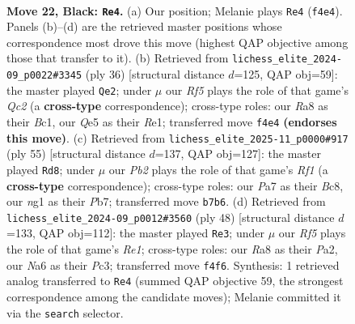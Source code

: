 \documentclass[11pt]{article}
\begin{document}
\clearpage

\begin{figure}[p]\centering
\begin{subfigure}{0.46\textwidth}\centering
\resizebox{\linewidth}{!}{%
\newchessgame
\chessboard[
  setfen={r1b2k2/pp3pp1/n3p3/3pq3/3n1r2/PPQ1N3/6PP/R2K2NR b - - 1 22},
  showmover=false,
  pgfstyle=straightmove, color=movearrow, markmove={f4-e4}
]}
\caption{}
\end{subfigure}\hfill
\begin{subfigure}{0.46\textwidth}\centering
\resizebox{\linewidth}{!}{%
\newchessgame
\chessboard[
  setfen={r6r/1pp1b1k1/p1n2n1p/5q2/3PN3/2P5/PPQ3PP/R1B1R1K1 w - - 1 19},
  showmover=false,
  pgfstyle=straightmove, color=movearrow, markmove={c2-e2}
]}
\caption{}
\end{subfigure}
\\[4pt]
\begin{subfigure}{0.46\textwidth}\centering
\resizebox{\linewidth}{!}{%
\newchessgame
\chessboard[
  setfen={2b2rk1/1pp2pb1/4p1p1/1Pnq4/3N3P/2Q5/2B2PP1/3R1K1R b - - 1 28},
  showmover=false,
  pgfstyle=straightmove, color=movearrow, markmove={f8-d8}
]}
\caption{}
\end{subfigure}\hfill
\begin{subfigure}{0.46\textwidth}\centering
\resizebox{\linewidth}{!}{%
\newchessgame
\chessboard[
  setfen={1r3r1k/6pp/b1pp1p2/4q3/P2RN3/2P4P/P1Q2PP1/4R1K1 w - - 2 25},
  showmover=false,
  pgfstyle=straightmove, color=movearrow, markmove={e1-e3}
]}
\caption{}
\end{subfigure}
\caption{\textbf{Move 22, Black: \texttt{Re4}.} (a) Our position; Melanie plays \texttt{Re4} (\texttt{f4e4}). Panels (b)--(d) are the retrieved master positions whose correspondence most drove this move (highest QAP objective among those that transfer to it). (b) Retrieved from \texttt{lichess\_elite\_2024-09\_p0022\#3345} (ply 36) [structural distance $d$=125, QAP obj=59]: the master played \texttt{Qe2}; under $\mu$ our \emph{Rf5} plays the role of that game's \emph{Qc2} (a \textbf{cross-type} correspondence); cross-type roles: our \emph{R}a8 as their \emph{B}c1, our \emph{Q}e5 as their \emph{R}e1; transferred move \texttt{f4e4} \textbf{(endorses this move)}. (c) Retrieved from \texttt{lichess\_elite\_2025-11\_p0000\#917} (ply 55) [structural distance $d$=137, QAP obj=127]: the master played \texttt{Rd8}; under $\mu$ our \emph{Pb2} plays the role of that game's \emph{Rf1} (a \textbf{cross-type} correspondence); cross-type roles: our \emph{P}a7 as their \emph{B}c8, our \emph{n}g1 as their \emph{P}b7; transferred move \texttt{b7b6}. (d) Retrieved from \texttt{lichess\_elite\_2024-09\_p0012\#3560} (ply 48) [structural distance $d$=133, QAP obj=112]: the master played \texttt{Re3}; under $\mu$ our \emph{Rf5} plays the role of that game's \emph{Re1}; cross-type roles: our \emph{R}a8 as their \emph{P}a2, our \emph{N}a6 as their \emph{P}c3; transferred move \texttt{f4f6}. Synthesis: 1 retrieved analog transferred to \texttt{Re4} (summed QAP objective 59, the strongest correspondence among the candidate moves); Melanie committed it via the \texttt{search} selector.}
\label{fig:thought-m43}
\end{figure}
\end{document}

